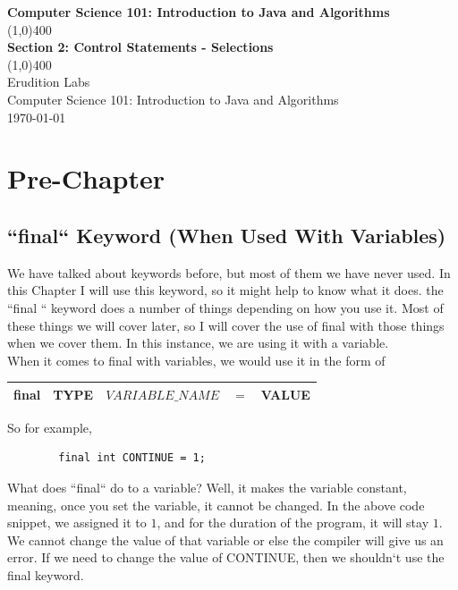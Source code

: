 \documentclass[11]{article}
\begin{document}
\begin{titlepage}
\begin{center}
\vspace{1cm}
\Large{\textbf{Computer Science 101: Introduction to Java and Algorithms}}\\
\vfill
\line(1,0){400}\\
\huge{\textbf{Section 2: Control Statements - Selections}}\\
\line(1,0){400}\\
\vfill
Erudition Labs\\
Computer Science 101: Introduction to Java and Algorithms\\
\today\\
\end{center}
\end{titlepage}

\tableofcontents
\thispagestyle{empty}
\clearpage
\setcounter{page}{1}

\section{Pre-Chapter}
\subsection{``final`` Keyword (When Used With Variables)}
\label{sec:final}
We have talked about keywords before, but most of them we have never used. In this Chapter I will use this keyword, so it might help to know what it does. the ``final	`` keyword does a number of things depending on how you use it. Most of these things we will cover later, so I will cover the use of final with those things when we cover them. In this instance, we are using it with a variable.\\

When it comes to final with variables, we would use it in the form of
\begin{center}
  \begin{tabular}{ | c | c | c | c | c |}
    \hline
    final &TYPE & $VARIABLE\_NAME$ & $=$ & VALUE  \\
    \hline
  \end{tabular}
\end{center}

So for example,
\begin{lstlisting}
        final int CONTINUE = 1;
\end{lstlisting}

What does ``final`` do to a variable? Well, it makes the variable constant, meaning, once you set the variable, it cannot be changed. In the above code snippet, we assigned it to $1$, and for the duration of the program, it will stay $1$. We cannot change the value of that variable or else the compiler will give us an error. If we need to change the value of CONTINUE, then we shouldn`t use the final keyword.
\end{document}
